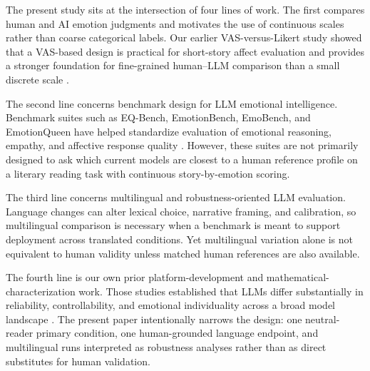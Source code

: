 The present study sits at the intersection of four lines of work. The first compares human and AI emotion judgments and motivates the use of continuous scales rather than coarse categorical labels. Our earlier VAS-versus-Likert study showed that a VAS-based design is practical for short-story affect evaluation and provides a stronger foundation for fine-grained human--LLM comparison than a small discrete scale \cite{shirahama2025vas}.

The second line concerns benchmark design for LLM emotional intelligence. Benchmark suites such as EQ-Bench, EmotionBench, EmoBench, and EmotionQueen have helped standardize evaluation of emotional reasoning, empathy, and affective response quality \cite{paech2024eqbench,huang2024emotionbench,sabour2024emobench,chen2024emotionqueen}. However, these suites are not primarily designed to ask which current models are closest to a human reference profile on a literary reading task with continuous story-by-emotion scoring.

The third line concerns multilingual and robustness-oriented LLM evaluation. Language changes can alter lexical choice, narrative framing, and calibration, so multilingual comparison is necessary when a benchmark is meant to support deployment across translated conditions. Yet multilingual variation alone is not equivalent to human validity unless matched human references are also available.

The fourth line is our own prior platform-development and mathematical-characterization work. Those studies established that LLMs differ substantially in reliability, controllability, and emotional individuality across a broad model landscape \cite{openrouterplatform,shirahama2026mdpi}. The present paper intentionally narrows the design: one neutral-reader primary condition, one human-grounded language endpoint, and multilingual runs interpreted as robustness analyses rather than as direct substitutes for human validation.